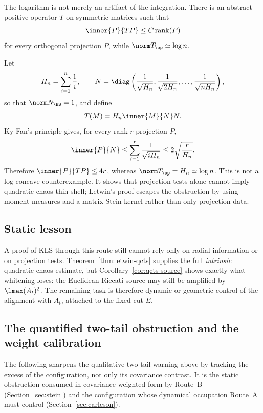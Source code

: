 \documentclass[../../main.tex]{subfiles}
\begin{document}
The logarithm is not merely an artifact of the integration. There is an abstract positive operator
$T$ on symmetric matrices such that
\[
  \inner{P}{TP}\le C\operatorname{rank}(P)
\]
for every orthogonal projection $P$, while $\norm T_{\op}\simeq\log n$.

Let
\[
  H_n=\sum_{i=1}^n\frac1i,
  \qquad
  N=\diag\left(\frac1{\sqrt{H_n}},\frac1{\sqrt{2H_n}},\ldots,\frac1{\sqrt{nH_n}}\right),
\]
so that $\norm N_{\HS}=1$, and define
\[
  T(M)=H_n\inner{M}{N}N.
\]
Ky Fan's principle gives, for every rank-$r$ projection $P$,
\[
  \inner{P}{N}\le\sum_{i=1}^r\frac1{\sqrt{iH_n}}\le2\sqrt{\frac r{H_n}}.
\]
Therefore $\inner{P}{TP}\le4r$, whereas $\norm T_{\op}=H_n\simeq\log n$. This is not a log-concave
counterexample. It shows that projection tests alone cannot imply quadratic-chaos thin shell;
Letwin's proof escapes the obstruction by using moment measures and a matrix Stein kernel rather
than only projection data.

\subsection{Static lesson}

A proof of KLS through this route still cannot rely only on radial information or on projection
tests. Theorem~\ref{thm:letwin-qcts} supplies the full \emph{intrinsic} quadratic-chaos estimate,
but Corollary~\ref{cor:qcts-source} shows exactly what whitening loses: the Euclidean Riccati
source may still be amplified by $\lmax(A_t)^2$. The remaining task is therefore dynamic or
geometric control of the alignment with $A_t$, attached to the fixed cut $E$.

\subsection{The quantified two-tail obstruction and the weight calibration}

The following sharpens the qualitative two-tail warning above by tracking the excess of the
configuration, not only its covariance contrast. It is the static obstruction consumed in
covariance-weighted form by Route~B (Section~\ref{sec:stein}) and the configuration whose
dynamical occupation Route~A must control (Section~\ref{sec:carleson}).
\end{document}
